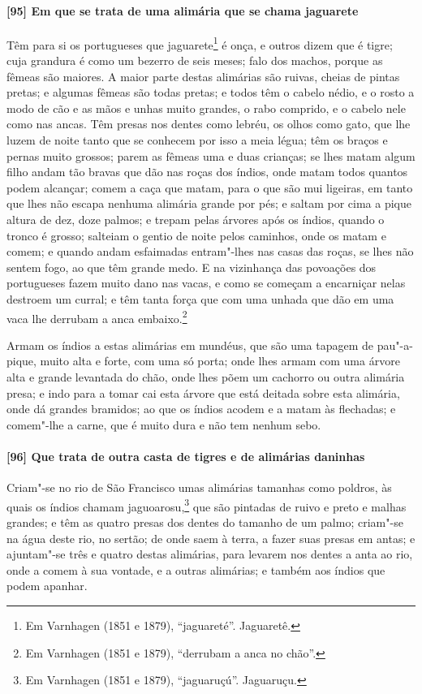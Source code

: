 \begin{linenumbers}
\paragraph{[95] Em que se trata de uma alimária que se chama jaguarete}\quad
Têm para si os portugueses que jaguarete\footnote{ Em Varnhagen (1851 e 1879),
``jaguareté''. Jaguaretê.} é onça, e outros dizem que é tigre; cuja grandura é como um
bezerro de seis meses; falo dos machos, porque as fêmeas são maiores. A maior parte destas
alimárias são ruivas, cheias de pintas pretas; e algumas fêmeas são todas pretas; e todos
têm o cabelo nédio, e o rosto a modo de cão e as mãos e unhas muito grandes, o rabo
comprido, e o cabelo nele como nas ancas. Têm presas nos dentes como lebréu, os olhos como
gato, que lhe luzem de noite tanto que se conhecem por isso a meia légua; têm os braços e
pernas muito grossos; parem as fêmeas uma e duas crianças; se lhes matam algum filho andam
tão bravas que dão nas roças dos índios, onde matam todos quantos podem alcançar; comem a
caça que matam, para o que são mui ligeiras, em tanto que lhes não escapa nenhuma alimária
grande por pés; e saltam por cima a pique altura de dez, doze palmos; e trepam pelas
árvores após os índios, quando o tronco é grosso; salteiam o gentio de noite pelos
caminhos, onde os matam e comem; e quando andam esfaimadas entram"-lhes nas casas das
roças, se lhes não sentem fogo, ao que têm grande medo. E na vizinhança das povoações dos
portugueses fazem muito dano nas vacas, e como se começam a encarniçar nelas destroem um
curral; e têm tanta força que com uma unhada que dão em uma vaca lhe derrubam a anca
embaixo.\footnote{ Em Varnhagen (1851 e 1879), ``derrubam a anca no chão''.}

Armam os índios a estas alimárias em mundéus, que são uma tapagem de pau"-a-pique, muito
alta e forte, com uma só porta; onde lhes armam com uma árvore alta e grande levantada do
chão, onde lhes põem um cachorro ou outra alimária presa; e indo para a tomar cai esta
árvore que está deitada sobre esta alimária, onde dá grandes bramidos; ao que os índios
acodem e a matam às flechadas; e comem"-lhe a carne, que é muito dura e não tem nenhum
sebo.

\paragraph{[96] Que trata de outra casta de tigres e de alimárias daninhas}\quad
Criam"-se no rio de São Francisco umas alimárias tamanhas como poldros, às quais os índios
chamam jaguoarosu,\footnote{ Em Varnhagen (1851 e 1879), ``jaguaruçú''. Jaguaruçu.} que
são pintadas de ruivo e preto e malhas grandes; e têm as quatro presas dos dentes do
tamanho de um palmo; criam"-se na água deste rio, no sertão; de onde saem à terra, a fazer
suas presas em antas; e ajuntam"-se três e quatro destas alimárias, para levarem nos dentes
a anta ao rio, onde a comem à sua vontade, e a outras alimárias; e também aos índios que
podem apanhar.


\end{linenumbers}
